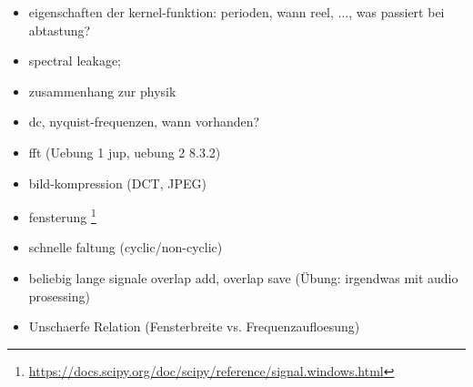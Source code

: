 \begin{itemize}
    \item eigenschaften der kernel-funktion: perioden, wann reel, ..., was passiert bei abtastung?
    \item spectral leakage;
    \item zusammenhang zur physik
    \item dc, nyquist-frequenzen, wann vorhanden?
    \item fft (Uebung 1 jup, uebung 2 8.3.2)
    \item bild-kompression (DCT, JPEG)
    \item fensterung \footnote{\url{https://docs.scipy.org/doc/scipy/reference/signal.windows.html}}
    \item schnelle faltung (cyclic/non-cyclic)
    \item beliebig lange signale overlap add, overlap save (\"Ubung: irgendwas mit audio prosessing)
    \item Unschaerfe Relation (Fensterbreite vs. Frequenzaufloesung)\cite[chpt. 4.2]{mallat2008wavelets}
\end{itemize}